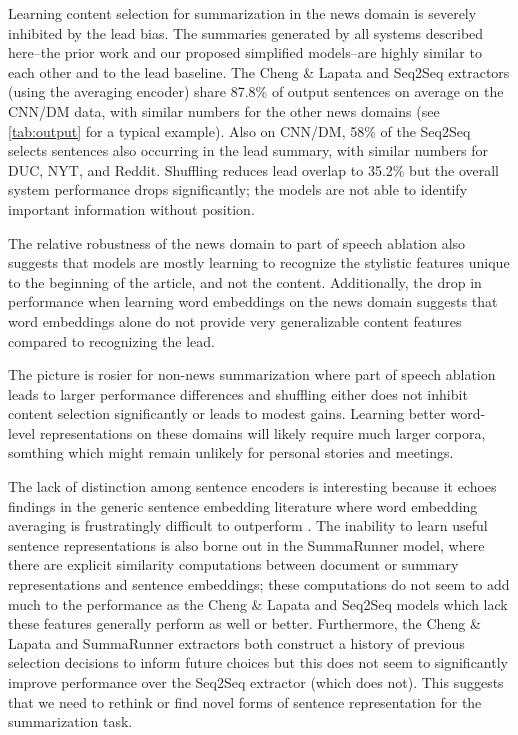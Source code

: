 
Learning content selection for summarization in the news domain is severely inhibited by the lead bias. 
The summaries generated by all systems described here--the prior work and our proposed simplified models--are highly similar to each other and to the lead 
baseline. The Cheng \& Lapata and Seq2Seq 
extractors (using the averaging encoder) share 87.8\% of output sentences on average on the CNN/DM data,
with similar numbers for the other news domains (see \autoref{tab:output}
for a typical example).  
Also on CNN/DM, 58\% of the Seq2Seq%
selects sentences also occurring
in the lead summary, with similar numbers for DUC, NYT, and Reddit. Shuffling
reduces lead overlap to 35.2\% but the overall system performance drops
    significantly; the models are not able to identify important information
    without position.
    
    The relative robustness of the news domain to part of speech ablation also 
    suggests that models are mostly learning to recognize the stylistic 
    features unique to the beginning of the article, and not the content.
    Additionally, the drop in performance when learning word embeddings on 
    the news domain suggests that word embeddings alone do not provide 
    very generalizable content features compared to recognizing the lead.

The picture is rosier for non-news summarization where part of speech ablation leads
to larger performance differences and shuffling either does not inhibit content
selection significantly or leads to modest gains. Learning better
word-level representations on these domains will likely require much
larger corpora, somthing which might remain unlikely for personal stories
and meetings.



The lack of distinction among sentence encoders is interesting because 
it echoes findings in the generic sentence embedding literature 
where word embedding averaging is frustratingly difficult to 
outperform  \cite{iyyer2015deep,wieting2015towards,arora2016simple,wieting2017revisiting}.
The inability to learn useful sentence representations is also 
borne out in the 
SummaRunner model, where there are explicit similarity computations
between document or summary representations and sentence embeddings;
these computations do not seem to add much to the performance as the 
Cheng \& Lapata and Seq2Seq models which lack these features generally
perform as well or better.
Furthermore, the Cheng \& Lapata and SummaRunner extractors both construct
a history of previous selection decisions to inform future choices but this
does not seem to significantly improve performance over the Seq2Seq extractor 
(which does not). This suggests that we need to rethink or find novel forms 
of sentence representation for the summarization task.


